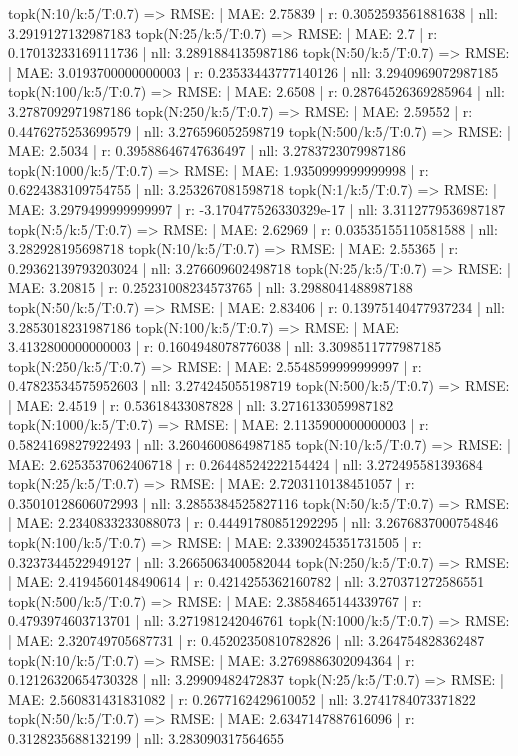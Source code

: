 topk(N:10/k:5/T:0.7) => RMSE: | MAE: 2.75839 | r: 0.3052593561881638 | nll: 3.2919127132987183
topk(N:25/k:5/T:0.7) => RMSE: | MAE: 2.7 | r: 0.17013233169111736 | nll: 3.2891884135987186
topk(N:50/k:5/T:0.7) => RMSE: | MAE: 3.0193700000000003 | r: 0.23533443777140126 | nll: 3.2940969072987185
topk(N:100/k:5/T:0.7) => RMSE: | MAE: 2.6508 | r: 0.28764526369285964 | nll: 3.2787092971987186
topk(N:250/k:5/T:0.7) => RMSE: | MAE: 2.59552 | r: 0.4476275253699579 | nll: 3.276596052598719
topk(N:500/k:5/T:0.7) => RMSE: | MAE: 2.5034 | r: 0.39588646747636497 | nll: 3.2783723079987186
topk(N:1000/k:5/T:0.7) => RMSE: | MAE: 1.9350999999999998 | r: 0.6224383109754755 | nll: 3.253267081598718
topk(N:1/k:5/T:0.7) => RMSE: | MAE: 3.2979499999999997 | r: -3.170477526330329e-17 | nll: 3.3112779536987187
topk(N:5/k:5/T:0.7) => RMSE: | MAE: 2.62969 | r: 0.03535155110581588 | nll: 3.282928195698718
topk(N:10/k:5/T:0.7) => RMSE: | MAE: 2.55365 | r: 0.29362139793203024 | nll: 3.276609602498718
topk(N:25/k:5/T:0.7) => RMSE: | MAE: 3.20815 | r: 0.25231008234573765 | nll: 3.2988041488987188
topk(N:50/k:5/T:0.7) => RMSE: | MAE: 2.83406 | r: 0.13975140477937234 | nll: 3.2853018231987186
topk(N:100/k:5/T:0.7) => RMSE: | MAE: 3.4132800000000003 | r: 0.1604948078776038 | nll: 3.3098511777987185
topk(N:250/k:5/T:0.7) => RMSE: | MAE: 2.5548599999999997 | r: 0.47823534575952603 | nll: 3.274245055198719
topk(N:500/k:5/T:0.7) => RMSE: | MAE: 2.4519 | r: 0.53618433087828 | nll: 3.2716133059987182
topk(N:1000/k:5/T:0.7) => RMSE: | MAE: 2.1135900000000003 | r: 0.5824169827922493 | nll: 3.2604600864987185
topk(N:10/k:5/T:0.7) => RMSE: | MAE: 2.6253537062406718 | r: 0.26448524222154424 | nll: 3.272495581393684
topk(N:25/k:5/T:0.7) => RMSE: | MAE: 2.7203110138451057 | r: 0.35010128606072993 | nll: 3.2855384525827116
topk(N:50/k:5/T:0.7) => RMSE: | MAE: 2.2340833233088073 | r: 0.44491780851292295 | nll: 3.2676837000754846
topk(N:100/k:5/T:0.7) => RMSE: | MAE: 2.3390245351731505 | r: 0.3237344522949127 | nll: 3.2665063400582044
topk(N:250/k:5/T:0.7) => RMSE: | MAE: 2.4194560148490614 | r: 0.4214255362160782 | nll: 3.270371272586551
topk(N:500/k:5/T:0.7) => RMSE: | MAE: 2.3858465144339767 | r: 0.4793974603713701 | nll: 3.271981242046761
topk(N:1000/k:5/T:0.7) => RMSE: | MAE: 2.320749705687731 | r: 0.45202350810782826 | nll: 3.264754828362487
topk(N:10/k:5/T:0.7) => RMSE: | MAE: 3.2769886302094364 | r: 0.12126320654730328 | nll: 3.29909482472837
topk(N:25/k:5/T:0.7) => RMSE: | MAE: 2.560831431831082 | r: 0.2677162429610052 | nll: 3.2741784073371822
topk(N:50/k:5/T:0.7) => RMSE: | MAE: 2.6347147887616096 | r: 0.3128235688132199 | nll: 3.283090317564655
